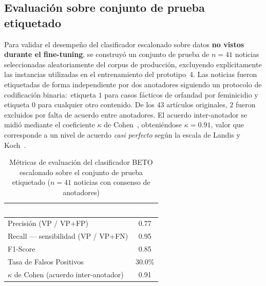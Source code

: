 
\subsection{Evaluación sobre conjunto de prueba etiquetado}
\label{subsec:res_metricas_clasificador}

Para validar el desempeño del clasificador escalonado sobre datos \textbf{no vistos
durante el fine-tuning}, se construyó un conjunto de prueba de $n=41$ noticias
seleccionadas aleatoriamente del corpus de producción, excluyendo explícitamente
las instancias utilizadas en el entrenamiento del prototipo~4.
Las noticias fueron etiquetadas de forma independiente por dos anotadores
siguiendo un protocolo de codificación binaria:\
etiqueta $1$ para casos fácticos de orfandad por feminicidio y etiqueta $0$
para cualquier otro contenido.
De los $43$ artículos originales, $2$ fueron excluidos por falta de acuerdo entre anotadores.
El acuerdo inter-anotador se midió mediante el coeficiente $\kappa$ de
Cohen~\cite{cohen1960coefficient}, obteniéndose $\kappa = 0.91$, valor
que corresponde a un nivel de acuerdo \textit{casi perfecto} según la escala
de Landis y Koch~\cite{landis1977measurement}.

\vspace{0.5cm}
\begin{table}[htbp]
\centering
\caption{Métricas de evaluación del clasificador BETO escalonado sobre el conjunto de prueba
etiquetado ($n = 41$ noticias con consenso de anotadores)}
\label{tab:metricas_clasificador}
\renewcommand{\arraystretch}{1.3}
\begin{tabular}{|l|c|}
\hline
\rowcolor{black}
\textcolor{white}{\textbf{Métrica}} & \textcolor{white}{\textbf{Valor}} \\
\hline
Precisión (VP / VP+FP) & 0.77 \\
\hline
Recall --- sensibilidad (VP / VP+FN) & 0.95 \\
\hline
F1-Score & 0.85 \\
\hline
Tasa de Falsos Positivos & 30.0\% \\
\hline
$\kappa$ de Cohen (acuerdo inter-anotador) & 0.91 \\
\hline
\end{tabular}
\end{table}
\vspace{0.4cm}

